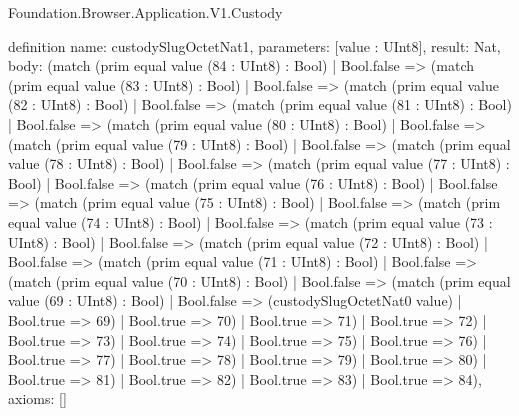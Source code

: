 \begin{lexlean}{Foundation.Browser.Application.V1.Custody}
\begin{semanticmodule}
definition{
  name: custodySlugOctetNat1,
  parameters: [value : UInt8],
  result: Nat,
  body: (match (prim equal value (84 : UInt8) : Bool)
    | Bool.false => (match (prim equal value (83 : UInt8) : Bool)
      | Bool.false => (match (prim equal value (82 : UInt8) : Bool)
        | Bool.false => (match (prim equal value (81 : UInt8) : Bool)
          | Bool.false => (match (prim equal value (80 : UInt8) : Bool)
            | Bool.false => (match (prim equal value (79 : UInt8) : Bool)
              | Bool.false => (match (prim equal value (78 : UInt8) : Bool)
                | Bool.false => (match (prim equal value (77 : UInt8) : Bool)
                  | Bool.false => (match (prim equal value (76 : UInt8) : Bool)
                    | Bool.false => (match (prim equal value (75 : UInt8) : Bool)
                      | Bool.false => (match (prim equal value (74 : UInt8) : Bool)
                        | Bool.false => (match (prim equal value (73 : UInt8) : Bool)
                          | Bool.false => (match (prim equal value (72 : UInt8) : Bool)
                            | Bool.false => (match (prim equal value (71 : UInt8) : Bool)
                              | Bool.false => (match (prim equal value (70 : UInt8) : Bool)
                                | Bool.false => (match (prim equal value (69 : UInt8) : Bool)
                                  | Bool.false => (custodySlugOctetNat0 value)
                                  | Bool.true => 69)
                                | Bool.true => 70)
                              | Bool.true => 71)
                            | Bool.true => 72)
                          | Bool.true => 73)
                        | Bool.true => 74)
                      | Bool.true => 75)
                    | Bool.true => 76)
                  | Bool.true => 77)
                | Bool.true => 78)
              | Bool.true => 79)
            | Bool.true => 80)
          | Bool.true => 81)
        | Bool.true => 82)
      | Bool.true => 83)
    | Bool.true => 84),
  axioms: []
}


\end{semanticmodule}
\end{lexlean}
